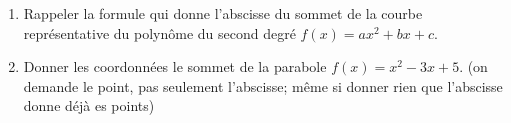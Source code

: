 
\begin{exercice}\label{exosmath-0091}

    \begin{enumerate}
        \item
            Rappeler la formule qui donne l'abscisse du sommet de la courbe représentative du polynôme du second degré \( f(x)=ax^2+bx+c\).
        \item
            Donner les coordonnées le sommet de la parabole \( f(x)=x^2-3x+5\). (on demande le point, pas seulement l'abscisse; même si donner rien que l'abscisse donne déjà es points)
    \end{enumerate}

\end{exercice}
